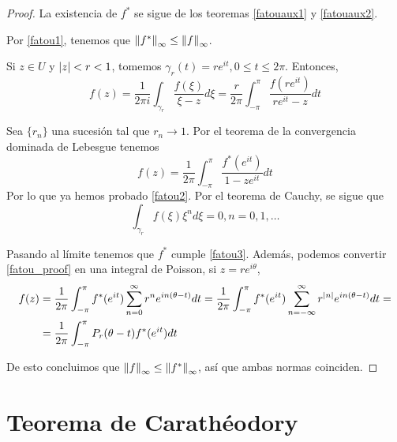 \begin{proof}
    La existencia de $f^*$ se sigue de los teoremas \ref{fatouaux1} y \ref{fatouaux2}.

    Por \ref{fatou1}, tenemos que $\left\lVert f^*\right\rVert_{\infty} \leq \left\lVert f\right\rVert_{\infty}$.

    Si $z \in U$ y $\left\lvert z\right\rvert < r < 1$, tomemos $\gamma_r(t) = r e^{it}, 0 \leq t \leq 2\pi$. Entonces,
    \begin{equation*}
        f(z) = \dfrac{1}{2 \pi i} \int_{\gamma_r} \dfrac{f(\xi)}{\xi - z} d\xi =
        \dfrac{r}{2 \pi} \int_{-\pi}^{\pi} \dfrac{f(re^{it})}{re^{it} - z} dt
    \end{equation*}

    Sea $\{r_n\}$ una sucesión tal que $r_n \rightarrow 1$. Por el teorema de la convergencia dominada de Lebesgue tenemos
    \begin{equation}
        \label{fatou_proof}
        f(z) = \dfrac{1}{2 \pi} \int_{-\pi}^{\pi} \dfrac{f^* (e^{it})}{1 - ze^{it}} dt
    \end{equation}
    Por lo que ya hemos probado \ref{fatou2}. Por el teorema de Cauchy, se sigue que
    \begin{equation*}
        \int_{\gamma_r} f(\xi)\xi^n d\xi = 0, n = 0, 1, \dots
    \end{equation*}

    Pasando al límite tenemos que $f^*$ cumple \ref{fatou3}. Además, podemos convertir \ref{fatou_proof} en una integral de Poisson, si $z = re^{i \theta}$,
    \begin{equation*}
         \begin{split}
             f(z) &  = \dfrac{1}{2 \pi} \int_{- \pi}^{\pi} f^*(e^{it}) \sum_{n=0}^{\infty} r^n e^{in(\theta - t)} dt =  \dfrac{1}{2 \pi} \int_{- \pi}^{\pi} f^*(e^{it}) \sum_{n=-\infty}^{\infty} r^{\left\lvert n\right\rvert} e^{in(\theta - t)} dt = \\
                  & =  \dfrac{1}{2 \pi} \int_{- \pi}^{\pi} P_r(\theta - t) f^*(e^{it}) dt
         \end{split}
    \end{equation*}

    De esto concluimos que $\left\lVert f\right\rVert_{\infty} \leq \left\lVert f^*\right\rVert_{\infty}$, así que ambas normas coinciden.
\end{proof}

\section{Teorema de Carathéodory}

